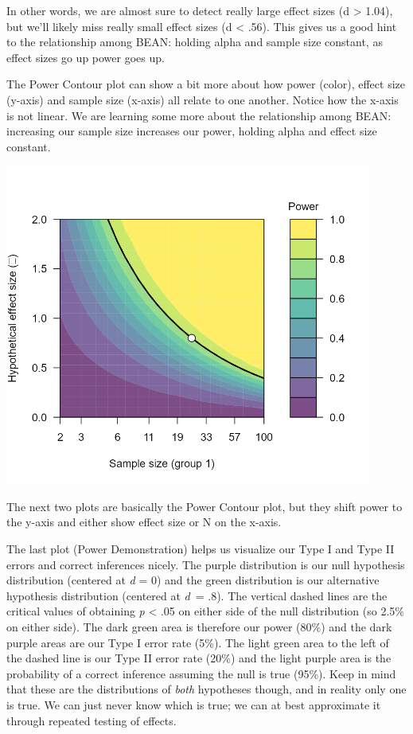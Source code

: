 \documentclass[
]{book}
\begin{document}
In other words, we are almost sure to detect really large effect sizes (d \textgreater{} 1.04), but we'll likely miss really small effect sizes (d \textless{} .56). This gives us a good hint to the relationship among BEAN: holding alpha and sample size constant, as effect sizes go up power goes up.

The Power Contour plot can show a bit more about how power (color), effect size (y-axis) and sample size (x-axis) all relate to one another. Notice how the x-axis is not linear. We are learning some more about the relationship among BEAN: increasing our sample size increases our power, holding alpha and effect size constant.

\includegraphics[width=4.76042in,height=\textheight]{images/05-bean/power-contour.png}

The next two plots are basically the Power Contour plot, but they shift power to the y-axis and either show effect size or N on the x-axis.

The last plot (Power Demonstration) helps us visualize our Type I and Type II errors and correct inferences nicely. The purple distribution is our null hypothesis distribution (centered at \emph{d} = 0) and the green distribution is our alternative hypothesis distribution (centered at \emph{d}~= .8). The vertical dashed lines are the critical values of obtaining \emph{p} \textless{} .05 on either side of the null distribution (so 2.5\% on either side). The dark green area is therefore our power (80\%) and the dark purple areas are our Type I error rate (5\%). The light green area to the left of the dashed line is our Type II error rate (20\%) and the light purple area is the probability of a correct inference assuming the null is true (95\%). Keep in mind that these are the distributions of \emph{both} hypotheses though, and in reality only one is true. We can just never know which is true; we can at best approximate it through repeated testing of effects.
\end{document}
